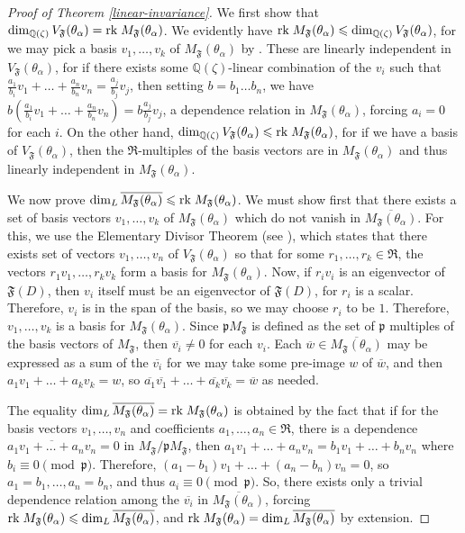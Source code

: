 \documentclass[12pt]{amsproc} %
\theoremstyle{definition}\newtheorem{defn}[thm]{Definition}
\theoremstyle{definition}\newtheorem{rem}[thm]{Remark}
\theoremstyle{definition}\newtheorem{ex}[thm]{Example}
\newcommand\rk{{\rm rk}\;}
\renewcommand\le{\leqslant}
\newcommand{\Q}{\mathbb{Q}}
\newcommand{\frakR}{\mathfrak{R}}
\newcommand{\repF}{\mathfrak{F}}
\newcommand{\p}{\mathfrak{p}}
\begin{document}
\begin{proof}[Proof of Theorem \ref{linear-invariance}]
	We first show that $\dim_{\Q(\zeta)} V_\repF(\theta_\alpha) = \rk M_\repF(\theta_\alpha)$. We evidently have $\rk M_\repF(\theta_\alpha) \le \dim_{\Q(\zeta)} V_\repF(\theta_\alpha)$, for we may pick a basis $v_1, \dots, v_k$ of $M_\repF(\theta_\alpha)$ by \cite[Theorem 7.1]{lang}. These are linearly independent in $V_\repF(\theta_\alpha)$, for if there exists some $\Q(\zeta)$-linear combination of the $v_i$ such that $\frac{a_1}{b_i}v_1 + \dots + \frac{a_n}{b_n}v_n = \frac{a_j}{b_j}v_j$, then setting $b = b_1\dots b_n$, we have $b(\frac{a_1}{b_i}v_1 + \dots + \frac{a_n}{b_n}v_n) = b\frac{a_j}{b_j}v_j$, a dependence relation in $M_\repF(\theta_\alpha)$, forcing $a_i = 0$ for each $i$. On the other hand, $\dim_{\Q(\zeta)} V_\repF(\theta_\alpha) \le \rk M_\repF(\theta_\alpha)$, for if we have a basis of $V_\repF(\theta_\alpha)$, then the $\frakR$-multiples of the basis vectors are in $M_\repF(\theta_\alpha)$ and thus linearly independent in $M_\repF(\theta_\alpha)$.
	
	We now prove $\dim_L \overline{M_\repF(\theta_\alpha)} \le \rk M_\repF(\theta_\alpha)$. We must show first that there exists a set of basis vectors $v_1, \dots, v_k$ of $M_\repF(\theta_\alpha)$ which do not vanish in $\overline{M_\repF(\theta_\alpha)}$. For this, we use the Elementary Divisor Theorem (see \cite[Chapter III, Theorem 7.8]{lang}), which states that there exists set of vectors $v_1, \dots, v_n$ of $V_\repF(\theta_\alpha)$ so that for some $r_1, \dots, r_k \in \frakR$, the vectors $r_1v_1, \dots, r_kv_k$ form a basis for $M_\repF(\theta_\alpha)$. Now, if $r_iv_i$ is an eigenvector of $\repF(D)$, then $v_i$ itself must be an eigenvector of $\repF(D)$, for $r_i$ is a scalar. Therefore, $v_i$ is in the span of the basis, so we may choose $r_i$ to be $1$. Therefore, $v_1, \dots, v_k$ is a basis for $M_\repF(\theta_\alpha)$. Since $\p M_\repF$ is defined as the set of $\p$ multiples of the basis vectors of $M_\repF$, then $\overline{v_i} \neq 0$ for each $v_i$. Each $\overline{w} \in \overline{M_\repF(\theta_\alpha)}$ may be expressed as a sum of the $\overline{v_i}$ for we may take some pre-image $w$ of $\overline{w}$, and then $a_1v_1 + \dots + a_kv_k = w$, so $\overline{a_1}\overline{v_1} + \dots + \overline{a_k}\overline{v_k} = \overline w$ as needed.
	
	
	
	The equality $\dim_L \overline{M_\repF(\theta_\alpha)} = \rk M_\repF(\theta_\alpha)$ is obtained by the fact that if for the basis vectors $v_1, \dots, v_n$ and coefficients $a_1, \dots, a_n \in \frakR$, there is a dependence $\overline{a_1v_1 + \dots + a_nv_n} = 0$ in $M_\repF / \p M_\repF$, then $a_1v_1 + \dots + a_nv_n = b_1v_1 + \dots + b_nv_n$ where $b_i \equiv 0 \pmod \p$. Therefore, $(a_1 - b_1)v_1 + \dots + (a_n - b_n)v_n = 0$, so $a_1 = b_1, \dots, a_n = b_n$, and thus $a_i \equiv 0 \pmod \p$. So, there exists only a trivial dependence relation among the $\overline{v_i}$ in $\overline{M_\repF(\theta_\alpha)}$, forcing $\rk M_\repF(\theta_\alpha) \le \dim_L \overline{M_\repF(\theta_\alpha)}$, and $\rk M_\repF(\theta_\alpha) = \dim_L \overline{M_\repF(\theta_\alpha)}$ by extension.
	

\end{proof}
\end{document}
